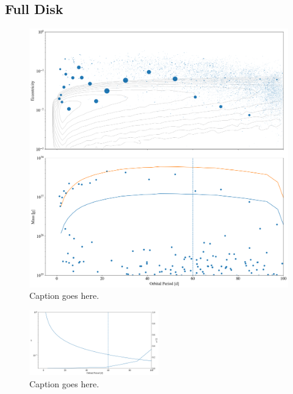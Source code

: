 \documentclass[onecolumn]{aastex63}
\begin{document}

\subsection{Full Disk}

\begin{figure}
\begin{center}
    \includegraphics[width=\textwidth]{figures/fulldisk_e_m.png}
    \caption{Caption goes here.\label{fig:fulldisk_e_m}}
\end{center}
\end{figure}

\begin{figure}
\begin{center}
    \includegraphics[width=0.5\textwidth]{figures/alpha_pl_frac.png}
    \caption{Caption goes here.\label{fig:alpha_pl_frac}}
\end{center}
\end{figure}
\end{document}
